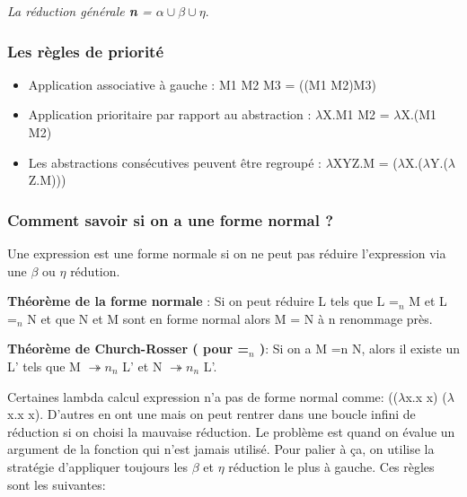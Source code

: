 \documentclass[10pt,a4paper]{article}
\begin{document}
				\textit{La réduction générale \textbf{n} = $\alpha \cup \beta \cup \eta$}.
				
				\subsubsection{Les règles de priorité}
					\begin{itemize}
						\item Application associative à gauche : M1 M2 M3 = ((M1 M2)M3)
						\item Application prioritaire par rapport au abstraction : $\lambda$X.M1 M2 =  $\lambda$X.(M1 M2)
						\item Les abstractions consécutives peuvent être regroupé : $\lambda$XYZ.M = ($\lambda$X.($\lambda$Y.($\lambda$Z.M)))
					\end{itemize}
				
				
				\subsubsection{Comment savoir si on a une forme normal ?}
				
				Une expression est une forme normale si on ne peut pas r\'{e}duire l'expression via une $\beta$ ou $\eta$ r\'{e}dution.
				\medbreak
				
				\textbf{Th\'{e}or\`{e}me de la forme normale} :
				Si on peut r\'{e}duire L tels que L =$_{n}$ M et L =$_{n}$ N et que N et M sont en forme normal alors M = N à n renommage pr\`{e}s.
				\medbreak	
				
				\textbf{Th\'{e}or\`{e}me de Church-Rosser ( pour =$_{n}$ )}:
				Si on a M =n N, alors il existe un L' tels que M $\twoheadrightarrow n_{n}$ L' et N $\twoheadrightarrow n_{n}$ L'.
				\medbreak
				
				Certaines lambda calcul expression n'a pas de forme normal comme: (($\lambda$x.x x) ($\lambda$x.x x). 
				\newline
				D'autres en ont une mais on peut rentrer dans une boucle infini de r\'{e}duction si on choisi la mauvaise r\'{e}duction.
				\medbreak
				Le probl\`{e}me est quand on \'{e}value un argument de la fonction qui n'est jamais utilis\'{e}. Pour palier \`{a} ça, on utilise la strat\'{e}gie d'appliquer toujours les $\beta$ et $\eta$ réduction le plus \`{a} gauche. Ces règles sont les suivantes:
				\medbreak
				
\end{document}
